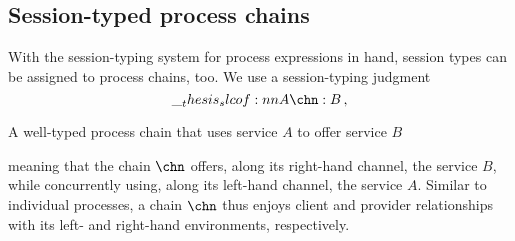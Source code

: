 


\subsection{Session-typed process chains}

With the session-typing system for process expressions in hand, session types can be assigned to process chains, too.
We use a session-typing judgment
\begin{equation*}
  \slcof{A |- \chn : B} \,,
\end{equation*}
%
\begin{marginfigure}[-4\baselineskip]
  \centering
  \caption{A well-typed process chain that uses service $A$ to offer service $B$}\label{fig:singleton-processes:well-typed-chain}
\end{marginfigure}%
%
meaning that the chain $\chn$ offers, along its right-hand channel, the service $B$, while concurrently using, along its left-hand channel, the service $A$.
Similar to individual processes, a chain $\chn$ thus enjoys client and provider relationships with its left- and right-hand environments, respectively.

